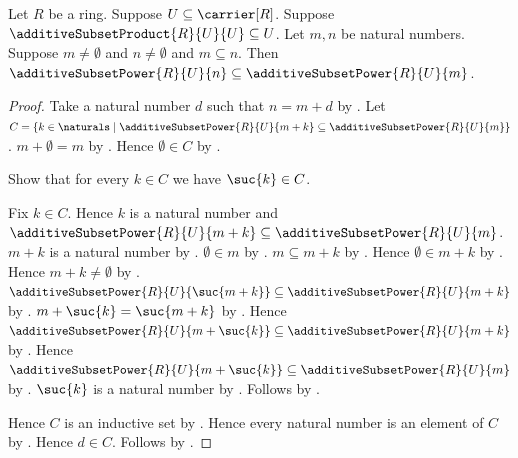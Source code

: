 \begin{theorem}\label{additive_subset_power_antitone}
    Let $R$ be a ring.
    Suppose $U\subseteq\carrier[R]$.
    Suppose $\additiveSubsetProduct{R}{U}{U}\subseteq U$.
    Let $m,n$ be natural numbers.
    Suppose $m\neq\emptyset$ and $n\neq\emptyset$ and $m\subseteq n$.
    Then $\additiveSubsetPower{R}{U}{n}
        \subseteq\additiveSubsetPower{R}{U}{m}$.
\end{theorem}
\begin{proof}
    Take a natural number $d$ such that $n=m+d$ by
        .
    Let $C=\{k\in\naturals\mid
        \additiveSubsetPower{R}{U}{m+k}
            \subseteq\additiveSubsetPower{R}{U}{m}\}$.
    $m+\emptyset=m$ by .
    Hence $\emptyset\in C$ by
        .

    Show that for every $k\in C$ we have $\suc{k}\in C$.
    \begin{subproof}
        Fix $k\in C$.
        Hence $k$ is a natural number and
            $\additiveSubsetPower{R}{U}{m+k}
                \subseteq\additiveSubsetPower{R}{U}{m}$.
        $m+k$ is a natural number by
            .
        $\emptyset\in m$ by
            .
        $m\subseteq m+k$ by
            .
        Hence $\emptyset\in m+k$ by .
        Hence $m+k\neq\emptyset$ by \auto.
        $\additiveSubsetPower{R}{U}{\suc{m+k}}
            \subseteq\additiveSubsetPower{R}{U}{m+k}$ by
            .
        $m+\suc{k}=\suc{m+k}$ by
            .
        Hence $\additiveSubsetPower{R}{U}{m+\suc{k}}
            \subseteq\additiveSubsetPower{R}{U}{m+k}$ by
            \auto.
        Hence $\additiveSubsetPower{R}{U}{m+\suc{k}}
            \subseteq\additiveSubsetPower{R}{U}{m}$ by
            .
        $\suc{k}$ is a natural number by .
        Follows by \auto.
    \end{subproof}
    Hence $C$ is an inductive set by .
    Hence every natural number is an element of $C$ by
        .
    Hence $d\in C$.
    Follows by \auto.
\end{proof}


